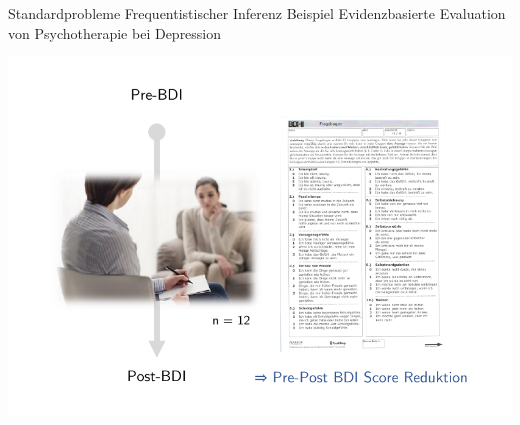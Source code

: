 \documentclass[
  8pt,
  ignorenonframetext,
]{beamer}
\begin{document}
\begin{frame}[t]{Standardprobleme Frequentistischer Inferenz}
\protect\hypertarget{standardprobleme-frequentistischer-inferenz-3}{}
Beispiel \textbar{} Evidenzbasierte Evaluation von Psychotherapie bei
Depression

\begin{center}\includegraphics[width=0.9\linewidth]{9_Abbildungen/wtfi_9_messplan} \end{center}
\end{frame}
\end{document}
